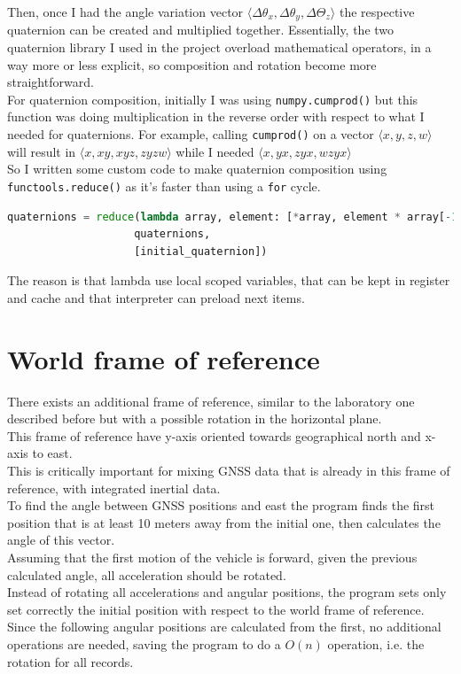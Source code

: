 Then, once I had the angle variation vector $\langle\Delta\theta_x,\Delta\theta_y,\Delta\Theta_z\rangle$ the respective quaternion can be created and multiplied together. 
Essentially, the two quaternion library I used in the project overload mathematical operators, in a way more or less explicit, so composition and rotation become more straightforward. \\
For quaternion composition, initially I was using \texttt{numpy.cumprod()} \cite{numpy-cumprod} but this function was doing multiplication in the reverse order with respect to what I needed for quaternions. For example, calling \texttt{cumprod()} on a vector $\langle x,y,z,w \rangle$ will result in $\langle x,xy,xyz,zyzw \rangle$ while I needed $\langle x,yx,zyx,wzyx \rangle$  \\

So I written some custom code to make quaternion composition using \texttt{functools.reduce()} as it's faster than using a \texttt{for} cycle.

\begin{lstlisting}[language=Python,frame=single]
quaternions = reduce(lambda array, element: [*array, element * array[-1]], 
					quaternions, 
					[initial_quaternion])
\end{lstlisting}
The reason is that lambda use local scoped variables, that can be kept in register and cache and that interpreter can preload next items.


\section{World frame of reference}
There exists an additional frame of reference, similar to the laboratory one described before but with a possible rotation in the horizontal plane. \\
This frame of reference have y-axis oriented towards geographical north and x-axis to east. \\
This is critically important for mixing GNSS data that is already in this frame of reference, with integrated inertial data. \\
To find the angle between GNSS positions and east the program finds the first position that is at least 10 meters away from the initial one, then calculates the angle of this vector. \\
Assuming that the first motion of the vehicle is forward, given the previous calculated angle, all acceleration should be rotated. \\
Instead of rotating all accelerations and angular positions, the program sets only set correctly the initial position with respect to the world frame of reference. Since the following angular positions are calculated from the first, no additional operations are needed, saving the program to do a $O(n)$ operation, i.e. the rotation for all records.